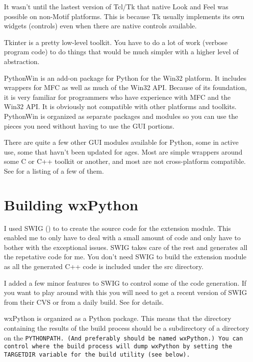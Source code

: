 It wasn't until the lastest version of Tcl/Tk that native Look and
Feel was possible on non-Motif platforms. This is because Tk
usually implements its own widgets (controls) even when there are
native controls available.

Tkinter is a pretty low-level toolkit. You have to do a lot of work
(verbose program code) to do things that would be much simpler with a higher
level of abstraction.


PythonWin is an add-on package for Python for the Win32 platform. It
includes wrappers for MFC as well as much of the Win32 API. Because
of its foundation, it is very familiar for programmers who have
experience with MFC and the Win32 API. It is obviously not compatible
with other platforms and toolkits. PythonWin is organized as separate
packages and modules so you can use the pieces you need without having
to use the GUI portions.


There are quite a few other GUI modules available for Python, some in
active use, some that havn't been updated for ages. Most are simple
wrappers around some C or C++ toolkit or another, and most are not
cross-platform compatible. See  
for a listing of a few of them.

\section{Building wxPython}\label{wxpbuild}

I used SWIG () to
to create the source code for the
extension module. This enabled me to only have to deal with a small
amount of code and only have to bother with the exceptional issues.
SWIG takes care of the rest and generates all the repetative code for
me. You don't need SWIG to build the extension module as all the
generated C++ code is included under the src directory.

I added a few minor features to SWIG to control some of the code
generation. If you want to play around with this you will need to get
a recent version of SWIG from their CVS or from a daily build. See
 for details.

wxPython is organized as a Python package. This means that the
directory containing the results of the build process should be a
subdirectory of a directory on the \tt{PYTHONPATH}. (And preferably should
be named wxPython.) You can control where the build process will dump
wxPython by setting the \tt{TARGETDIR} variable for the build utility (see
below).

